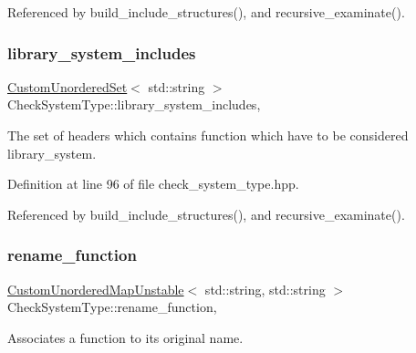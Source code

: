 Referenced by build\+\_\+include\+\_\+structures(), and recursive\+\_\+examinate().

\mbox{\label{classCheckSystemType_a921be1aeea25c77292b88e96d40882a5}} 
\subsubsection{\texorpdfstring{library\+\_\+system\+\_\+includes}{library\_system\_includes}}
{\footnotesize\ttfamily \hyperlink{classCustomUnorderedSet}{Custom\+Unordered\+Set}$<$ std\+::string $>$ Check\+System\+Type\+::library\+\_\+system\+\_\+includes\hspace{0.3cm}{\ttfamily [static]}, {\ttfamily [private]}}



The set of headers which contains function which have to be considered library\+\_\+system. 



Definition at line 96 of file check\+\_\+system\+\_\+type.\+hpp.



Referenced by build\+\_\+include\+\_\+structures(), and recursive\+\_\+examinate().

\mbox{\label{classCheckSystemType_af954e17fc21b9b472a5720ade293c6fb}} 
\subsubsection{\texorpdfstring{rename\+\_\+function}{rename\_function}}
{\footnotesize\ttfamily \hyperlink{custom__map_8hpp_a8cbaceffc09790a885ec7e9c17809c69}{Custom\+Unordered\+Map\+Unstable}$<$ std\+::string, std\+::string $>$ Check\+System\+Type\+::rename\+\_\+function\hspace{0.3cm}{\ttfamily [static]}, {\ttfamily [private]}}



Associates a function to its original name. 



